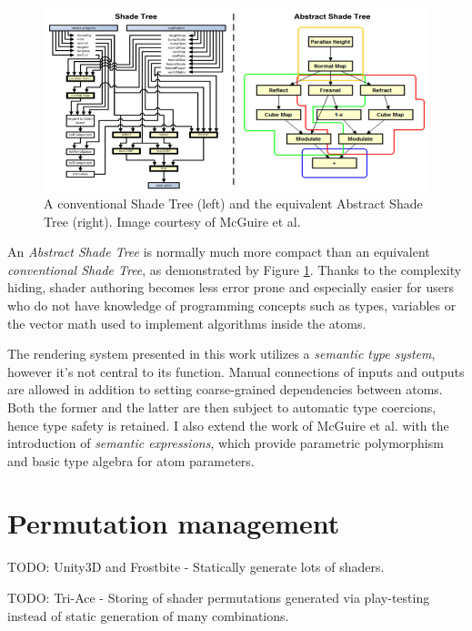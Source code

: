 \begin{figure}[h!]
  \centering
    \includegraphics[width=0.9\linewidth]{./Chapters/AbstractShadeTree.jpg}
    \caption[Abstract Shade Tree]{A conventional Shade Tree (left) and the equivalent Abstract Shade Tree (right). Image courtesy of McGuire et al.}
  \label{fig:AbstractShadeTree}
\end{figure}

An \emph{Abstract Shade Tree} is normally much more compact than an equivalent \emph{conventional Shade Tree}, as demonstrated by Figure \ref{fig:AbstractShadeTree}. Thanks to the complexity hiding, shader authoring becomes less error prone and especially easier for users who do not have knowledge of programming concepts such as types, variables or the vector math used to implement algorithms inside the atoms.
 

The rendering system presented in this work utilizes a \emph{semantic type system}, however it's not central to its function. Manual connections of inputs and outputs are allowed in addition to setting coarse-grained dependencies between atoms. Both the former and the latter are then subject to automatic type coercions, hence type safety is retained. I also extend the work of McGuire et al. with the introduction of \emph{semantic expressions}, which provide parametric polymorphism and basic type algebra for atom parameters.

\section{Permutation management}

TODO: Unity3D and Frostbite - Statically generate lots of shaders.

TODO: Tri-Ace - Storing of shader permutations generated via play-testing instead of static generation of many combinations.
